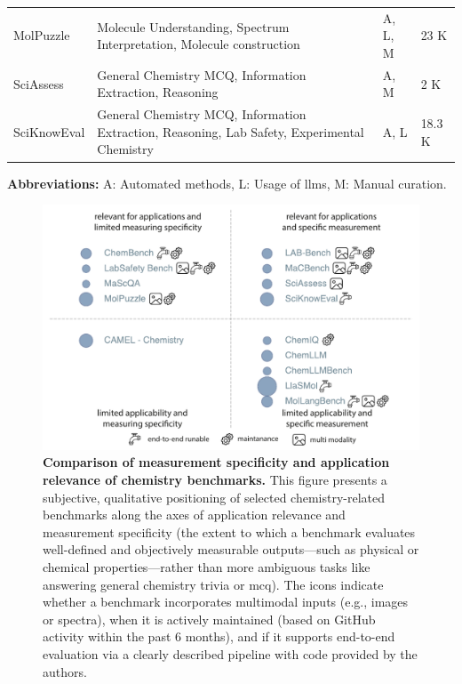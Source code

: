 \begin{table}
\begin{tabular}{p{3cm} p{6.9cm} p{1.2cm} p{1cm}}
MolPuzzle \autocite{guocan} & Molecule Understanding, Spectrum Interpretation, Molecule construction & A, L, M & 23 K \\
SciAssess \autocite{cai2024sciassess0} & General Chemistry MCQ, Information Extraction, Reasoning & A, M & 2 K \\
SciKnowEval \autocite{feng2024sciknoweval0} & General Chemistry MCQ, Information Extraction, Reasoning, Lab Safety, Experimental Chemistry & A, L & 18.3 K \\
\bottomrule
\end{tabular}
\begin{tablenotes}
\footnotesize
\item \textbf{Abbreviations:} 
A: Automated methods, L: Usage of \glspl{llm}, M: Manual curation.
\end{tablenotes}
\end{table}


\begin{figure}
    \centering
    \label{fig:benchmarks}
    \includegraphics[width=1\textwidth]{figures/rescaled_figures/chemrev_figure8.pdf}
    \caption{\textbf{Comparison of measurement specificity and application relevance of chemistry benchmarks.} This figure presents a subjective, qualitative positioning of selected chemistry-related benchmarks along the axes of application relevance and measurement specificity (the extent to which a benchmark evaluates well-defined and objectively measurable outputs---such as physical or chemical properties---rather than more ambiguous tasks like answering general chemistry trivia or \gls{mcq}). The icons indicate whether a benchmark incorporates multimodal inputs (e.g., images or spectra), when it is actively maintained (based on GitHub activity within the past 6 months), and if it supports end-to-end evaluation via a clearly described pipeline with code provided by the authors.}
\end{figure}


